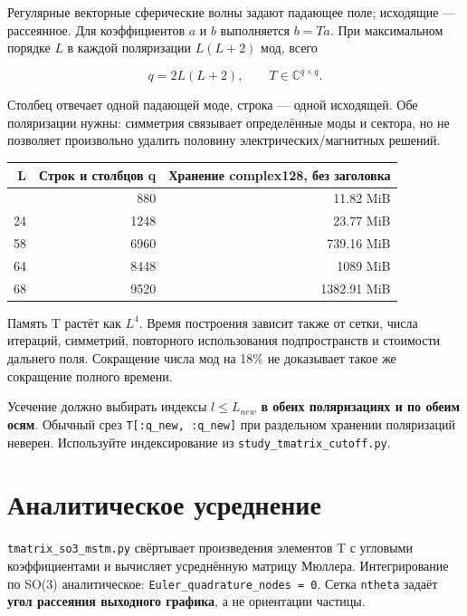 \documentclass[
  russian,
  11pt,
  a4paper,
]{report}
\newcounter{none} %
\begin{document}
Регулярные векторные сферические волны задают падающее поле; исходящие
--- рассеянное. Для коэффициентов \(a\) и \(b\) выполняется \(b=Ta\).
При максимальном порядке \(L\) в каждой поляризации \(L(L+2)\) мод,
всего

\[q=2L(L+2),\qquad T\in\mathbb C^{q\times q}.\]

Столбец отвечает одной падающей моде, строка --- одной исходящей. Обе
поляризации нужны: симметрия связывает определённые моды и сектора, но
не позволяет произвольно удалить половину электрических/магнитных
решений.

{\def\LTcaptype{none} %
\begin{longtable}[]{@{}rrr@{}}
\toprule\noalign{}
L & Строк и столбцов q & Хранение complex128, без заголовка \\
\midrule\noalign{}
\endhead
\bottomrule\noalign{}
\endlastfoot
20 & 880 & 11.82 MiB \\
24 & 1248 & 23.77 MiB \\
58 & 6960 & 739.16 MiB \\
64 & 8448 & 1089 MiB \\
68 & 9520 & 1382.91 MiB \\
\end{longtable}
}

Память T растёт как \(L^4\). Время построения зависит также от сетки,
числа итераций, симметрий, повторного использования подпространств и
стоимости дальнего поля. Сокращение числа мод на 18\% не доказывает
такое же сокращение полного времени.

Усечение должно выбирать индексы \(l\leq L_{new}\) \textbf{в обеих
поляризациях и по обеим осям}. Обычный срез
\nolinkurl{T[:q_new, :q_new]} при раздельном хранении поляризаций
неверен. Используйте индексирование из
\nolinkurl{study_tmatrix_cutoff.py}.

\section{Аналитическое
усреднение}\label{ux430ux43dux430ux43bux438ux442ux438ux447ux435ux441ux43aux43eux435-ux443ux441ux440ux435ux434ux43dux435ux43dux438ux435}

\nolinkurl{tmatrix_so3_mstm.py} свёртывает произведения элементов T с
угловыми коэффициентами и вычисляет усреднённую матрицу Мюллера.
Интегрирование по SO(3) аналитическое:
\nolinkurl{Euler_quadrature_nodes = 0}. Сетка \nolinkurl{ntheta} задаёт
\textbf{угол рассеяния выходного графика}, а не ориентации частицы.
\end{document}
